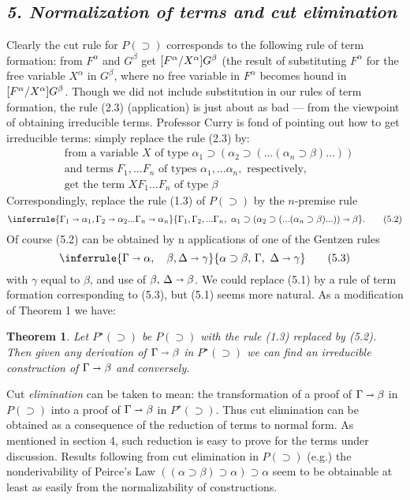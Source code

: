 \documentclass[12pt]{article}
\def\imp{\shortrightarrow}
\def\D{D}
\def\limp{\supset}
\def\PI{P(\limp)}
\def\G{\Gamma}
\def\a{\alpha}
\def\b{\beta}
\def\D{\Delta}
\def\PIstar{P^\star(\limp)}
\def\gimpb{\G \imp \b}
\newtheorem{theorem}{Theorem}
\begin{document}
\subsection*{\it 5. Normalization of terms and cut elimination}

Clearly the cut rule for $\PI$ corresponds to the following rule of term formation: from $F^\a$ and $G^\b$ get $\fxg$ (the result of substituting $F^\a$ for the free variable $X^\a$ in $G^\b$, where no free variable in $F^\a$ becomes hound in $\fxg$. Though we did not include substitution in our rules of term formation, the rule (2.3) (application) is just about as bad --- from the viewpoint of obtaining irreducible terms. Professor Curry is fond of pointing out how to get irreducible terms: simply replace the rule (2.3) by:
\begin{align*}
&{\text{from a variable }} X \text{ of type } \a_1 \limp (\a_2 \limp ( ... ( \a_n \limp \b)... ))\\
\tag{5.1}&\text{and terms } F_1, ... F_n \text{ of types }  \a_1, ... \a_n, \text{ respectively,} \\ 
&\text{get the term }  XF_1 ... F_n\text{ of type } \b
\end{align*}
Correspondingly, replace the rule (1.3) of $\PI$ by the $n$-premise rule
\begin{equation}
\inferrule{\G_1 \imp \a_1, \G_2 \imp \a_2 ... \G_n \imp \a_n}{\G_1, \G_2, ... \G_n,\,\,  \a_1 \limp (\a_2 \limp ( ... ( \a_n \limp \b)... )) \imp \b}.
\tag{5.2}
\end{equation}
Of course (5.2) can be obtained by n applications of one of the Gentzen rules
\begin{equation}
\inferrule{\G \imp \a, \quad \b, \D \imp \gamma}{\a \limp \b, \,\G, \,\,\D \imp \gamma}
\tag{5.3}
\end{equation}
with $\gamma$ equal to $\b$, and use of $\b,\, \D \imp \b$. We could replace (5.1) by a rule of term formation corresponding to (5.3), but (5.1) seems more natural. As a modification of Theorem 1 we have:

\begin{theorem}
Let $\PIstar$ be $\PI$ with the rule {\rm (1.3)} replaced by {\rm (5.2)}. Then given any derivation of $\G \imp \b$
in  $\PIstar$ we can find an irreducible construction of $\G \imp \b$ and conversely.
\end{theorem}
Cut {\it elimination} can be taken to mean: the transformation of a proof of $\gimpb$ in $\PI$ into a proof of $\gimpb$ in $\PIstar$. Thus cut elimination can be obtained as a consequence of the reduction of terms to normal form. As mentioned in section 4, such reduction is easy to prove for the terms under discussion. Results following from cut elimination in $\PI$ (e.g.) the nonderivability of Peirce's Law $((\a \limp \b) \limp \a) \limp \a$ seem to be obtainable at least as easily from the normalizability of constructions.
\end{document}
